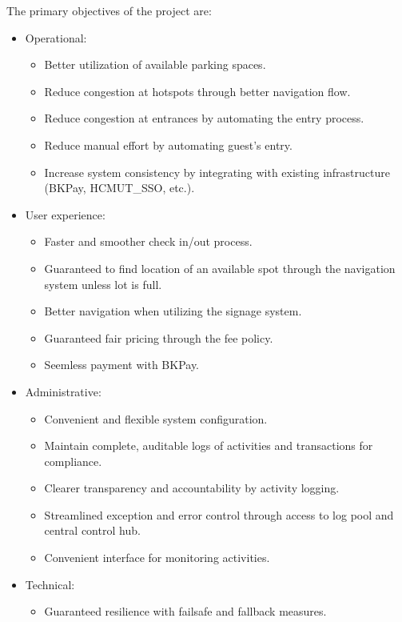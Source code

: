 The primary objectives of the project are:
\begin{itemize}
    \item Operational:
    \begin{itemize}
        \item Better utilization of available parking spaces.
        \item Reduce congestion at hotspots through better navigation flow.
        \item Reduce congestion at entrances by automating the entry process.
        \item Reduce manual effort by automating guest's entry.
        \item Increase system consistency by integrating with existing infrastructure (BKPay, HCMUT\_SSO, etc.).
    \end{itemize}
    \item User experience:
    \begin{itemize}
        \item Faster and smoother check in/out process.
        \item Guaranteed to find location of an available spot through the navigation system unless lot is full.
        \item Better navigation when utilizing the signage system.
        \item Guaranteed fair pricing through the fee policy.
        \item Seemless payment with BKPay. 
    \end{itemize}
    \item Administrative:
    \begin{itemize}
        \item Convenient and flexible system configuration.
        \item Maintain complete, auditable logs of activities and transactions for compliance.
        \item Clearer transparency and accountability by activity logging.
        \item Streamlined exception and error control through access to log pool and central control hub.
        \item Convenient interface for monitoring activities. 
    \end{itemize}
    \item Technical:
    \begin{itemize}
        \item Guaranteed resilience with failsafe and fallback measures.

\end{itemize}
\end{itemize}
